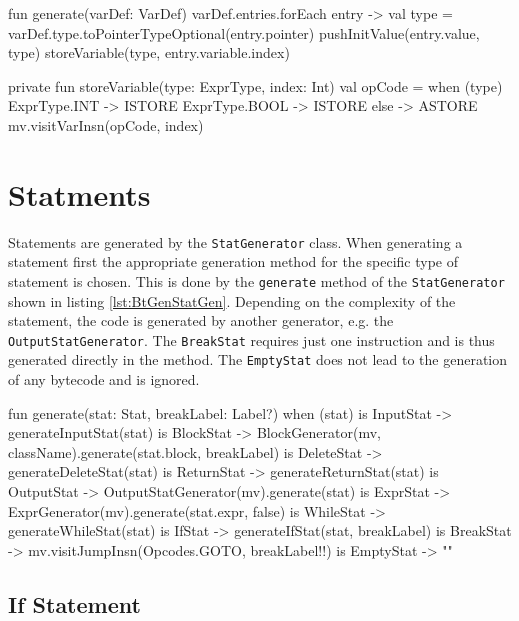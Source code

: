 \begin{KotlinCode}[float,numbers=none,caption=Code for the definition of local variables., label=lst:BtGenVarDef]
fun generate(varDef: VarDef) {
    varDef.entries.forEach { entry ->
        val type = varDef.type.toPointerTypeOptional(entry.pointer)
        pushInitValue(entry.value, type)
        storeVariable(type, entry.variable.index)
    }
}

private fun storeVariable(type: ExprType, index: Int) {
    val opCode = when (type) {
        ExprType.INT -> ISTORE
        ExprType.BOOL -> ISTORE
        else -> ASTORE
    }
    mv.visitVarInsn(opCode, index)
}
\end{KotlinCode}

\section{Statments}

Statements are generated by the \verb|StatGenerator| class. When generating a statement first the appropriate generation method for the specific type of statement is chosen. This is done by the \verb|generate| method of the \verb|StatGenerator| shown in listing \ref{lst:BtGenStatGen}. Depending on the complexity of the statement, the code is generated by another generator, e.g. the \verb|OutputStatGenerator|. The \verb|BreakStat| requires just one instruction and is thus generated directly in the method. The \verb|EmptyStat| does not lead to the generation of any bytecode and is ignored. 

\begin{KotlinCode}[float,numbers=none,caption=Implementation of the \texttt{generate} method of the \texttt{StatGenerator}., label=lst:BtGenStatGen]
fun generate(stat: Stat, breakLabel: Label?) {
    when (stat) {
        is InputStat -> generateInputStat(stat)
        is BlockStat -> BlockGenerator(mv, className).generate(stat.block, breakLabel)
        is DeleteStat -> generateDeleteStat(stat)
        is ReturnStat -> generateReturnStat(stat)
        is OutputStat -> OutputStatGenerator(mv).generate(stat)
        is ExprStat -> ExprGenerator(mv).generate(stat.expr, false)
        is WhileStat -> generateWhileStat(stat)
        is IfStat -> generateIfStat(stat, breakLabel)
        is BreakStat -> mv.visitJumpInsn(Opcodes.GOTO, breakLabel!!)
        is EmptyStat -> ""
    }
}
\end{KotlinCode}

\subsection{If Statement}

